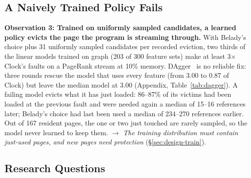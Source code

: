 \documentclass{article}
\newcommand{\clock}{Clock\xspace}
\newcommand{\belady}{Belady\xspace}
\newcommand{\obs}[2]{\textbf{Observation #1: #2}\hspace{0.4em}}
\begin{document}
\subsection{A Naively Trained Policy Fails}
\label{sec:bg-naive}

\obs{3}{Trained on uniformly sampled candidates, a learned policy evicts the page the
program is streaming through.}
With \belady's choice plus 31 uniformly sampled candidates per recorded eviction, two
thirds of the linear models trained on graph (203 of 300 feature sets) make at least
3$\times$ \clock's faults on a PageRank stream at 10\% memory. DAgger~\citep{ross2011dagger}
is no reliable fix: three rounds rescue the model that uses every feature (from 3.00 to
0.87 of \clock) but leave the median model at 3.00 (Appendix, Table~\ref{tab:dagger}). A
failing model evicts what it has
just loaded: 86--87\% of its victims had been loaded at the previous fault and were needed
again a median of 15--16 references later; \belady's choice had last been used a median of
234--270 references earlier. Out of 167
resident pages, the one or two just touched are rarely sampled, so the model never learned
to keep them.
$\rightarrow$ \emph{The training distribution must contain just-used pages, and new pages
need protection} (\S\ref{sec:design-train}).

\subsection{Research Questions}
\label{sec:bg-rq}
\end{document}
